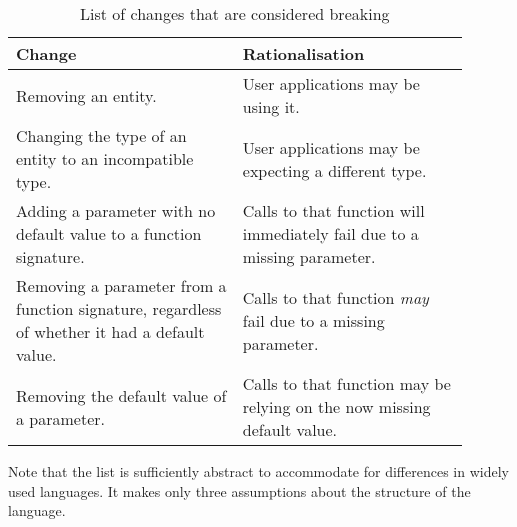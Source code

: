 \documentclass{l4proj}
\begin{document}
\begin{table}[H]
\centering
\begin{tabular}{|p{0.45\linewidth}|p{0.45\linewidth}|}
\hline
\textbf{Change}                                                                               & \textbf{Rationalisation}                                                 \\
\hline
Removing an entity.                                                                           & User applications may be using it.                                       \\
\hline
Changing the type of an entity to an incompatible type.                                       & User applications may be expecting a different type.                     \\
\hline
Adding a parameter with no default value to a function signature.                             & Calls to that function will immediately fail due to a missing parameter. \\
\hline
Removing a parameter from a function signature, regardless of whether it had a default value. & Calls to that function \textit{may} fail due to a missing parameter.     \\
\hline
Removing the default value of a parameter.                                                    & Calls to that function may be relying on the now missing default value.  \\
\hline
\end{tabular}
\caption{List of changes that are considered breaking}
\end{table}

Note that the list is sufficiently abstract to accommodate for
differences in widely used languages. It makes only three assumptions
about the structure of the language.
\end{document}
